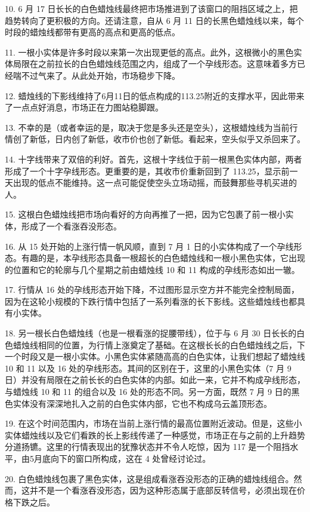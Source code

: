 10. 6 月 17 日长长的白色蜡烛线最终把市场推进到了该窗口的阻挡区域之上，把趋势转向了更积极的方向。还请注意，自从 6 月 11 日的长黑色蜡烛线以来，每个时段的蜡烛线都带有更高的高点和更高的低点。

11. 一根小实体是许多时段以来第一次出现更低的高点。此外，这根微小的黑色实体局限在之前拉长的白色蜡烛线范围之内，组成了一个孕线形态。这意味着多方已经喘不过气来了。从此处开始，市场稳步下降。

12. 蜡烛线的下影线维持了6月11日的低点构成的113.25附近的支撑水平，因此带来了一点点好消息，市场正在力图站稳脚跟。

13. 不幸的是（或者幸运的是，取决于您是多头还是空头），这根蜡烛线为当前行情创了新低，日内创了新低，收市价也创了新低。看起来，空头似乎又杀回来了。

14. 十字线带来了双倍的利好。首先，这根十字线位于前一根黑色实体内部，两者形成了一个十字孕线形态。更重要的是，其收市价重新回到了 113.25，显示前一天出现的低点不能维持。这一点可能促使空头立场动摇，而鼓舞那些寻机买进的人。

15. 这根白色蜡烛线把市场向看好的方向再推了一把，因为它包裹了前一根小实体，形成了一个看涨吞没形态。

16. 从 15 处开始的上涨行情一帆风顺，直到 7 月 1 日的小实体构成了一个孕线形态。有趣的是，本孕线形态具备一根超长的白色蜡烛线和一根小黑色实体，它出现的位置和它的轮廓与几个星期之前由蜡烛线 10 和 11 构成的孕线形态如出一辙。

17. 行情从 16 处的孕线形态开始下降，不过图形显示空方并不能完全控制局面，因为在这轮小规模的下跌行情中包括了一系列看涨的长下影线。这些蜡烛线也都具有小实体。

18. 另一根长白色蜡烛线（也是一根看涨的捉腰带线），位于与 6 月 30 日长长的白色蜡烛线相同的位置，为行情上涨奠定了基础。在这根长长的白色蜡烛线之后，下一个时段又是一根小实体。小黑色实体紧随高高的白色实体，让我们想起了蜡烛线 10 和 11 以及 16 处的孕线形态。其间的区别在于，这里的小黑色实体（7 月 9 日）并没有局限在之前长长的白色实体的内部。如此一来，它并不构成孕线形态，与蜡烛线 10 和 11 的组合以及 16 处的形态不同。另一方面，既然 7 月 9 日的黑色实体没有深深地扎入之前的白色实体内部，它也不构成乌云盖顶形态。

19. 在这个时间范围内，市场在当前上涨行情的最高位置附近波动。但是，这些小实体蜡烛线以及它们看跌的长上影线传递了一种感觉，市场正在与之前的上升趋势分道扬镳。这里的行情表现出的犹豫状态并不令人吃惊，因为 117 是一个阻挡水平，由5月底向下的窗口所构成，这在 4 处曾经讨论过。

20. 白色蜡烛线包裹了黑色实体，这是组成看涨吞没形态的正确的蜡烛线组合。然而，这并不是一个看涨吞没形态，因为这种形态属于底部反转信号，必须出现在价格下跌之后。

